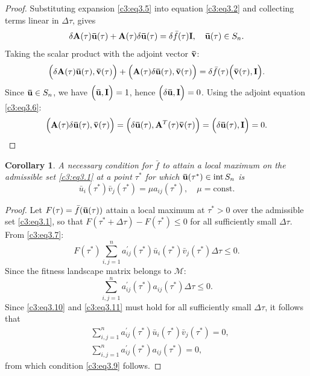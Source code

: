 \documentclass[12pt]{report}
\newcommand{\inside}{\mathrm{int}\,}
\newcommand{\const}{\mathrm{const}}
\newtheorem{conseq}[theorem]{Corollary}
\theoremstyle{definition}
\theoremstyle{remark}
\begin{document}
\begin{proof}
Substituting expansion \eqref{c3:eq3.5} into equation \eqref{c3:eq3.2} and collecting terms linear in $\Delta\tau$, gives
\begin{equation}
	\delta{\bf A}(\tau){\bf \bar{u}}(\tau) + {\bf A}(\tau)\delta{\bf \bar{u}}(\tau) = \delta \bar{f}(\tau){\bf I}, \quad {\bf \bar{u}}(\tau) \in S_{n}.
	\label{c3:eq3.8}
\end{equation}
Taking the scalar product with the adjoint vector ${\bf \bar{v}}$:
$$
	\Big(\delta{\bf A}(\tau){\bf \bar{u}}(\tau), {\bf \bar{v}}(\tau)\Big) + \Big({\bf A}(\tau)\delta{\bf \bar{u}}(\tau), {\bf \bar{v}}(\tau)\Big) = \delta\bar{f}(\tau)\Big({\bf \bar{v}}(\tau), {\bf I}\Big).
$$
Since ${\bf \bar{u}} \in S_{n}$, we have $\Big({\bf \bar{u}}, {\bf I}\Big) = 1$, hence $\Big(\delta{\bf \bar{u}}, {\bf I}\Big) = 0$. Using the adjoint equation \eqref{c3:eq3.6}:
$$
	\Big({\bf A}(\tau)\delta{\bf \bar{u}}(\tau), {\bf \bar{v}}(\tau)\Big) = \Big(\delta{\bf \bar{u}}(\tau), {\bf A}^{T}(\tau){\bf \bar{v}}(\tau)\Big) = \Big(\delta{\bf \bar{u}}(\tau), {\bf I}\Big) = 0. 
$$
\end{proof}

\begin{conseq}
A necessary condition for $\bar{f}$ to attain a local maximum on the admissible set \eqref{c3:eq3.1} at a point $\tau^{*}$ for which ${\bf \bar{u}}(\tau^{*}) \in \inside S_{n}$ is
\begin{equation}
	\bar{u}_{i}(\tau^{*})\bar{v}_{j}(\tau^{*}) = \mu a_{ij}(\tau^{*}), \quad \mu = \const.
	\label{c3:eq3.9}
\end{equation}
\end{conseq}

\begin{proof}
Let $F(\tau) = \bar{f}({\bf \bar{u}}(\tau))$ attain a local maximum at $\tau^{*} > 0$ over the admissible set \eqref{c3:eq3.1}, so that $F(\tau^* + \Delta\tau) - F(\tau^*) \leqslant 0$ for all sufficiently small $\Delta\tau$. From \eqref{c3:eq3.7}:
\begin{equation}\label{c3:eq3.10}
	F(\tau^*)\sum\limits_{i,j=1}^n a_{ij}^{'} (\tau^*)\bar{u}_i(\tau^*)\bar{v}_j(\tau^*) \Delta \tau \leqslant 0.
\end{equation}
Since the fitness landscape matrix belongs to  $\mathcal{M}$:
\begin{equation}\label{c3:eq3.11}
	\sum\limits_{i,j=1}^n a_{ij}^{'} (\tau^*)a_{ij}(\tau^*) \Delta \tau \leqslant 0.
\end{equation}
Since \eqref{c3:eq3.10} and \eqref{c3:eq3.11} must hold for all sufficiently small $\Delta\tau$, it follows that
\begin{equation*}
	\begin{aligned}	
		&\sum\limits_{i,j=1}^n a_{ij}^{'}(\tau^*)\bar{u}_i(\tau^*)\bar{v}_j(\tau^*) = 0, \\		
		&\sum\limits_{i,j=1}^n a_{ij}^{'}(\tau^*)a_{ij}(\tau^*) = 0,
	\end{aligned}
\end{equation*}
from which condition \eqref{c3:eq3.9} follows. 
\end{proof}
\end{document}

